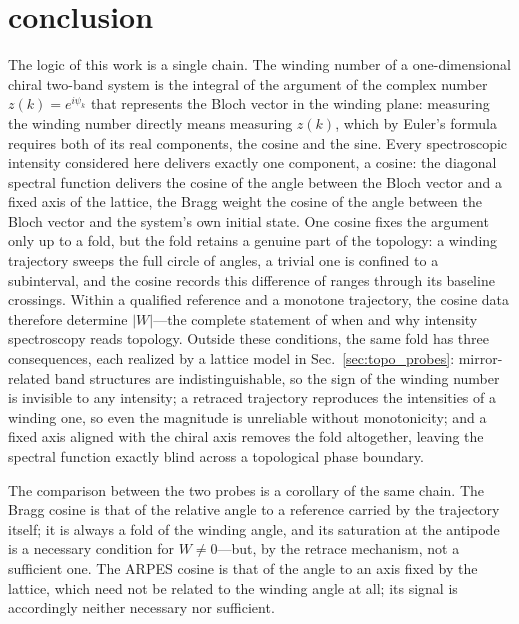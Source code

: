 \documentclass[onecolumn,aps,prl,superscriptaddress,longbibliography]{revtex4-2}
\begin{document}
\section{conclusion}\label{sec:conclusion}
The logic of this work is a single chain. The winding number of a one-dimensional chiral two-band system is the integral of the argument of the complex number $z(k)=e^{i\psi_k}$ that represents the Bloch vector in the winding plane: measuring the winding number directly means measuring $z(k)$, which by Euler's formula requires both of its real components, the cosine and the sine. Every spectroscopic intensity considered here delivers exactly one component, a cosine: the diagonal spectral function delivers the cosine of the angle between the Bloch vector and a fixed axis of the lattice, the Bragg weight the cosine of the angle between the Bloch vector and the system's own initial state. One cosine fixes the argument only up to a fold, but the fold retains a genuine part of the topology: a winding trajectory sweeps the full circle of angles, a trivial one is confined to a subinterval, and the cosine records this difference of ranges through its baseline crossings. Within a qualified reference and a monotone trajectory, the cosine data therefore determine $|W|$---the complete statement of when and why intensity spectroscopy reads topology. Outside these conditions, the same fold has three consequences, each realized by a lattice model in Sec.~\ref{sec:topo_probes}: mirror-related band structures are indistinguishable, so the sign of the winding number is invisible to any intensity; a retraced trajectory reproduces the intensities of a winding one, so even the magnitude is unreliable without monotonicity; and a fixed axis aligned with the chiral axis removes the fold altogether, leaving the spectral function exactly blind across a topological phase boundary.

The comparison between the two probes is a corollary of the same chain. The Bragg cosine is that of the relative angle to a reference carried by the trajectory itself; it is always a fold of the winding angle, and its saturation at the antipode is a necessary condition for $W\neq0$---but, by the retrace mechanism, not a sufficient one. The ARPES cosine is that of the angle to an axis fixed by the lattice, which need not be related to the winding angle at all; its signal is accordingly neither necessary nor sufficient.
\end{document}
